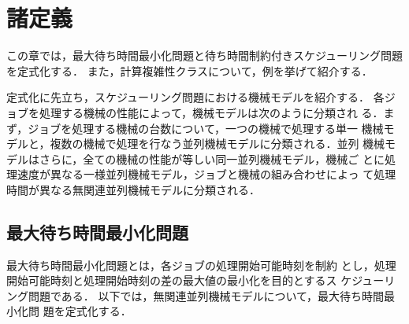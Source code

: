 \documentclass[12pt]{optlab-bachelor}
\begin{document}
\chapter{諸定義}\label{c_2}
この章では，最大待ち時間最小化問題と待ち時間制約付きスケジューリング問題を定式化する．
また，計算複雑性クラスについて，例を挙げて紹介する．

定式化に先立ち，スケジューリング問題における機械モデルを紹介する．
各ジョブを処理する機械の性能によって，機械モデルは次のように分類され
る．まず，ジョブを処理する機械の台数について，一つの機械で処理する単一
機械モデルと，複数の機械で処理を行なう並列機械モデルに分類される．並列
機械モデルはさらに，全ての機械の性能が等しい同一並列機械モデル，機械ご
とに処理速度が異なる一様並列機械モデル，ジョブと機械の組み合わせによっ
て処理時間が異なる無関連並列機械モデルに分類される．

\section{最大待ち時間最小化問題}
最大待ち時間最小化問題とは，各ジョブの処理開始可能時刻を制約
とし，処理開始可能時刻と処理開始時刻の差の最大値の最小化を目的とするス
ケジューリング問題である．
以下では，無関連並列機械モデルについて，最大待ち時間最小化問
題を定式化する．
\end{document}
